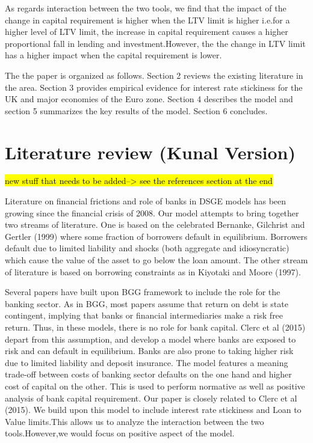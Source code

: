 \documentclass[12pt]{article}
\numberwithin{equation}{section}
\begin{document}
As regards interaction between the two tools, we find that the impact of the change in capital requirement is higher when the LTV limit is higher i.e.for a higher level of LTV limit, the increase in capital requirement causes a higher proportional fall in lending and investment.However, the  the change in LTV limit has a higher impact when the capital requirement is lower.

The the paper is organized as follows. Section 2 reviews the existing literature in the area. Section 3 provides empirical evidence for interest rate stickiness for the UK and major economies of the Euro zone. Section 4 describes the model and section 5 summarizes the key results of the model.
Section 6 concludes.


\section{Literature review (Kunal Version)}

\hl{new stuff that needs to be added--> see the references section at the end}

Literature on financial frictions and role of banks in DSGE models has been growing since the financial crisis of 2008. Our model attempts to bring together two streams of literature. One is based on the celebrated Bernanke, Gilchrist and Gertler (1999) where some fraction of borrowers default in equilibrium. Borrowers default due to limited liability and shocks (both aggregate and idiosyncratic) which cause the value of the asset to go below the loan amount. The other stream of literature is based on borrowing constraints as in Kiyotaki and Moore (1997).

Several papers have built upon BGG framework to include the role for the banking sector. As in BGG, most papers assume that return on debt is state contingent, implying that banks or financial intermediaries make a risk free return. Thus, in these models, there is no role for bank capital. Clerc et al (2015) depart from this assumption, and develop a model where banks are exposed to risk and can default in equilibrium. Banks are also prone to taking higher risk due to limited liability and deposit insurance. The model features a meaning trade-off between costs of banking sector defaults on the one hand and higher cost of capital on the other. This is used to perform normative as well as positive analysis of bank capital requirement. Our paper is closely related to Clerc et al (2015). We build upon this model to include interest rate stickiness and  Loan to Value limits.This allows us to analyze the interaction between the two tools.However,we would focus on positive aspect of the model.
\end{document}
